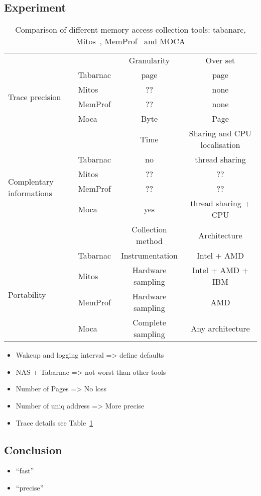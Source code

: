 \subsection{Experiment}
\label{sec:expe-ovh}
\begin{table}
    \centering
    \begin{tabular}{p{1.3cm}lcc}
        \toprule
        & & Granularity & Over set \\
        \cmidrule(lr){3-4}
        \multirow{4}{.8cm}{Trace precision}
        & Tabarnac & page & page \\
        & Mitos & ?? & none \\
        & MemProf & ?? & none \\
        & Moca & Byte & Page \\
        \midrule
        & & Time & Sharing and CPU localisation \\
        \cmidrule(lr){3-4}
        \multirow{4}{.8cm}{Complentary informations}
        & Tabarnac & no & thread sharing\\
        & Mitos & ?? & ?? \\
        & MemProf & ?? & ?? \\
        & Moca & yes & thread sharing + CPU \\
        \midrule
        & & Collection method & Architecture \\
        \cmidrule(lr){3-4}
        \multirow{4}{.8cm}{Portability}
        & Tabarnac & Instrumentation & Intel + AMD \\
        & Mitos & Hardware sampling & Intel + AMD + IBM \\
        & MemProf & Hardware sampling & AMD \\
        & Moca & Complete sampling & Any architecture\\
        \bottomrule
    \end{tabular}
    \caption{Comparison of different memory access collection
        tools: tabanarc\cite{Beniamine15TABARNACRR},
        Mitos~\cite{Gimenez14Dissecting},
        MemProf~\cite{Lachaize12MemProf} and MOCA}
        \label{tab:tools-comp}
    \end{table}

    \begin{itemize}
        \item Wakeup and logging interval => define defaults
        \item NAS + Tabarnac => not worst than other tools
        \item Number of Pages => No loss
        \item Number of uniq address => More precise
        \item Trace details see Table~\ref{tab:tools-comp}
    \end{itemize}

    \subsection{Conclusion}
    \label{sec:expe-cncl}

    \begin{itemize}
        \item ``fast''
        \item ``precise''
    \end{itemize}
